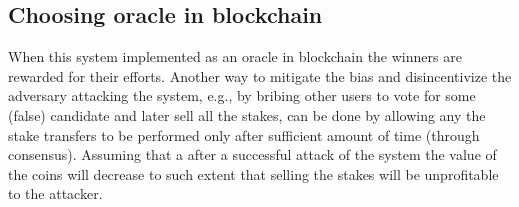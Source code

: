\documentclass[]{paper}
\begin{document}
\subsection{Choosing oracle in blockchain}
When this system implemented as an oracle in blockchain the winners are rewarded for their efforts.
Another way to  mitigate the bias and disincentivize the adversary attacking the system, e.g., by bribing other users to vote for some (false) candidate and later sell all the stakes, 
can be done by allowing any the stake transfers to be performed only after sufficient amount of time  (through consensus).  Assuming that a after a successful attack of the system the value of the coins will decrease to such extent that selling the stakes will be unprofitable to the attacker. 



\end{document}
